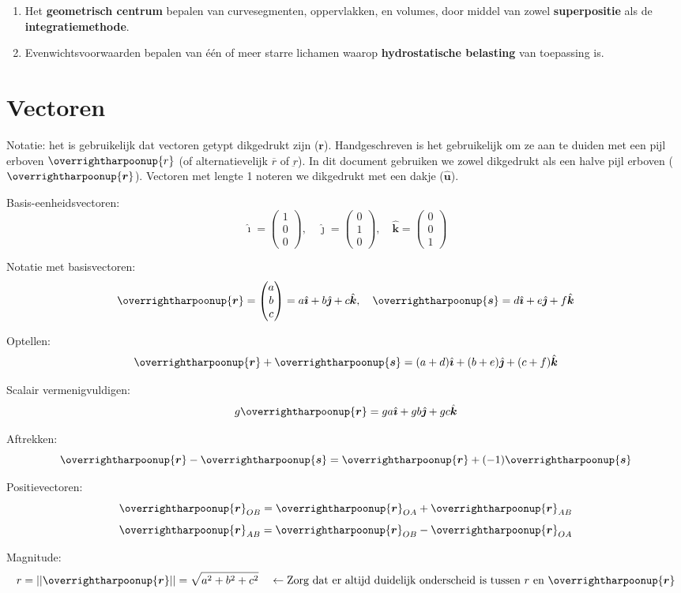 \documentclass{article}
\renewcommand{\v}[1]{\overrightharpoonup{\bm{#1}}}
\renewcommand{\u}[1]{\hat{\bm{#1}}}
\renewcommand{\r}{\v{r}}
\renewcommand{\i}{\hat{\bm{\imath}}}
\renewcommand{\j}{\hat{\bm{\jmath}}}
\renewcommand{\k}{\u{k}}
\begin{document}
\begin{enumerate}
\item Het \textbf{geometrisch centrum} bepalen van curvesegmenten, oppervlakken, en volumes, door middel van zowel \textbf{superpositie} als de \textbf{integratiemethode}.
\item Evenwichtsvoorwaarden bepalen van één of meer starre lichamen waarop \textbf{hydrostatische belasting} van toepassing is.
\end{enumerate}

\newpage
\section{Vectoren}

Notatie: het is gebruikelijk dat vectoren getypt dikgedrukt zijn ($\bm{r}$). Handgeschreven is het gebruikelijk om ze aan te duiden met een pijl erboven $\overrightharpoonup{r}$ (of alternatievelijk $\overbar{r}$ of $\underbar{r}$). In dit document gebruiken we zowel dikgedrukt als een halve pijl erboven ($\v{r}$). Vectoren met lengte 1 noteren we dikgedrukt met een dakje ($\u{u}$).


Basis-eenheidsvectoren:
$$ \i = \begin{pmatrix} 1 \\ 0 \\ 0 \end{pmatrix}, \quad \j = \begin{pmatrix} 0 \\ 1 \\ 0 \end{pmatrix}, \quad \k = \begin{pmatrix} 0 \\ 0 \\ 1 \end{pmatrix}$$

Notatie met basisvectoren:
$$ \v{r} = \begin{pmatrix} a \\ b \\ c \end{pmatrix}=a\i+b\j+c\k, \quad \v{s} = d\i + e\j + f\k$$ 

Optellen:
$$ \v{r} + \v{s} = (a+d)\i + (b+e)\j + (c+f)\k  $$

Scalair vermenigvuldigen:
$$ g\v{r} = ga\i + gb\j + gc\k$$

Aftrekken:
$$ \v{r} - \v{s} = \v{r} + (-1)\v{s} $$

Positievectoren:
$$\r_{O B} = \r_{O A} + \r_{A B}$$
$$\r_{A B} = \r_{O B} - \r_{O A}$$

Magnitude:
$$r = ||\v{r}|| = \sqrt{a^2+b^2+c^2}\quad\leftarrow\text{Zorg dat er altijd duidelijk onderscheid is tussen $r$ en $\v{r}$}$$
\end{document}
